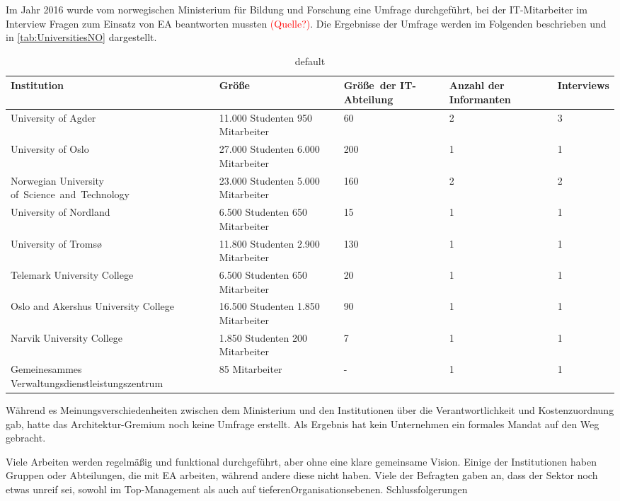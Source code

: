 \documentclass[
	doc,
	a4paper,
	helv
	]{apa6}
\begin{document}
Im Jahr 2016 wurde vom norwegischen Ministerium für Bildung und Forschung eine Umfrage durchgeführt, bei der IT-Mitarbeiter im Interview Fragen zum Einsatz von EA beantworten mussten \textcolor{red}{(Quelle?)}. Die Ergebnisse der Umfrage werden im Folgenden beschrieben und in \autoref{tab:UniversitiesNO} dargestellt.
\begin{table}[htbp]
\caption{default}
\begin{center}
\begin{tabularx}{\textwidth}{|p{5cm}|p{3cm}|X|X|X|}
\hline
Institution										& Größe									& \mbox{Größe der} \mbox{IT-Abteilung}	& Anzahl der Informanten	& Interviews \\\hline
University of Agder								& 11.000 Studenten 950 Mitarbeiter		& 60						& 2 						& 3 \\\hline
University of Oslo								& 27.000 Studenten 6.000 Mitarbeiter	& 200						& 1							& 1 \\\hline
Norwegian University \mbox{of Science and Technology}	& 23.000 Studenten 5.000 Mitarbeiter	& 160						& 2 						& 2 \\\hline
University of Nordland							& 6.500 Studenten 650 Mitarbeiter		& 15						& 1 						& 1 \\\hline
University of Troms\o							& 11.800 Studenten 2.900 Mitarbeiter	& 130 						& 1 						& 1 \\\hline
Telemark University College						& 6.500 Studenten 650 Mitarbeiter 		& 20 						& 1 						& 1 \\\hline
Oslo and Akershus University College			& 16.500 Studenten 1.850 Mitarbeiter	& 90 						& 1 						& 1 \\\hline
Narvik University College						& 1.850 Studenten 200 Mitarbeiter 		& 7							& 1 						& 1 \\\hline
Gemeinesammes Verwaltungsdienstleistungszentrum	& 85 Mitarbeiter 						& -		 					& 1 						& 1 \\\hline
\end{tabularx}
\end{center}
\label{tab:UniversitiesNO}
\end{table}%


Während es Meinungsverschiedenheiten zwischen dem Ministerium und den Institutionen über die Verantwortlichkeit und Kostenzuordnung gab, hatte das Architektur-Gremium noch keine Umfrage erstellt. Als Ergebnis hat kein Unternehmen ein formales Mandat auf den Weg gebracht.

Viele Arbeiten werden regelmäßig und funktional durchgeführt, aber ohne eine klare gemeinsame Vision. Einige der Institutionen haben Gruppen oder Abteilungen, die mit EA arbeiten, während andere diese nicht haben. Viele der Befragten gaben an, dass der Sektor noch etwas unreif sei, sowohl im Top-Management als auch auf tieferenOrganisationsebenen.
Schlussfolgerungen
\end{document}
